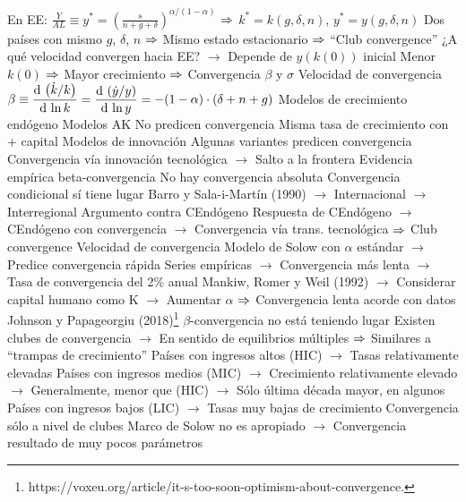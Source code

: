 \documentclass{nuevotema}
\begin{document}
\begin{esquemal}
				\4[] En EE: $\frac{Y}{AL} \equiv y^* = \left( \frac{s}{n+g+\delta} \right)^{\alpha/(1-\alpha)}$
				\4[] $\Rightarrow$ $k^* = k(g,\delta,n)$, $y^* = y(g,\delta,n)$
				\4[] Dos países con mismo $g$, $\delta$, $n$
				\4[] $\Rightarrow$ Mismo estado estacionario
				\4[] $\Rightarrow$ ``Club convergence''
				\4[] ¿A qué velocidad convergen hacia EE?
				\4[] $\to$ Depende de $y(k(0))$ inicial
				\4[] Menor $k(0)$ $\Rightarrow$ Mayor crecimiento
				\4[] $\Rightarrow$ Convergencia $\beta$ y $\sigma$
				\4 Velocidad de convergencia
				\4[] $\beta \equiv \dfrac{\text{d} \, \left( \dot{k}/k \right)}{\text{d} \, \ln k} = \dfrac{\text{d} \, \left( \dot{y}/y \right) }{\text{d} \, \ln y} = -(1-\alpha) \cdot (\delta + n + g)$
			\3 Modelos de crecimiento endógeno
				\4 Modelos AK
				\4[] No predicen convergencia
				\4[] Misma tasa de crecimiento con + capital
				\4 Modelos de innovación
				\4[] Algunas variantes predicen convergencia
				\4[] Convergencia vía innovación tecnológica
				\4[] $\to$ Salto a la frontera
		\2 Evidencia empírica
			\3 beta-convergencia
				\4 No hay convergencia absoluta
				\4 Convergencia condicional sí tiene lugar
				\4[] Barro y Sala-i-Martín (1990)
				\4[] $\to$ Internacional
				\4[] $\to$ Interregional
				\4[] Argumento contra CEndógeno
				\4[] Respuesta de CEndógeno
				\4[] $\to$ CEndógeno con convergencia
				\4[] $\to$ Convergencia vía trans. tecnológica
				\4[] $\Rightarrow$ Club convergence
				\4 Velocidad de convergencia
				\4[] Modelo de Solow con $\alpha$ estándar
				\4[] $\to$ Predice convergencia rápida
				\4[] Series empíricas
				\4[] $\to$ Convergencia más lenta
				\4[] $\to$ Tasa de convergencia del 2\% anual
				\4[] Mankiw, Romer y Weil (1992)
				\4[] $\to$ Considerar capital humano como K
				\4[] $\to$ Aumentar $\alpha$
				\4[] $\Rightarrow$ Convergencia lenta acorde con datos
				\4 Johnson y Papageorgiu (2018)\footnote{https://voxeu.org/article/it-s-too-soon-optimism-about-convergence.}
				\4[] $\beta$-convergencia no está teniendo lugar
				\4[] Existen clubes de convergencia
				\4[] $\to$ En sentido de equilibrios múltiples
				\4[] $\Rightarrow$ Similares a ``trampas de crecimiento''
				\4[] Países con ingresos altos (HIC)
				\4[] $\to$ Tasas relativamente elevadas
				\4[] Países con ingresos medios (MIC)
				\4[] $\to$ Crecimiento relativamente elevado
				\4[] $\to$ Generalmente, menor que (HIC)
				\4[] $\to$ Sólo última década mayor, en algunos
				\4[] Países con ingresos bajos (LIC)
				\4[] $\to$ Tasas muy bajas de crecimiento
				\4[] Convergencia sólo a nivel de clubes
				\4[] Marco de Solow no es apropiado
				\4[] $\to$ Convergencia resultado de muy pocos parámetros

\end{esquemal}
\end{document}

